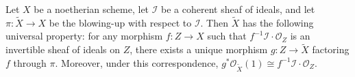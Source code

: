 Let $X$ be a noetherian scheme, let $\mathcal{I}$ be a coherent sheaf of ideals, and let $\pi: \tilde{X} \to X$ be the blowing-up with respect to $\mathcal{I}$. Then $\tilde{X}$ has the following universal property: for any morphism $f: Z \to X$ such that $f^{-1}\mathcal{I} \cdot \mathcal{O}_Z$ is an invertible sheaf of ideals on $Z$, there exists a unique morphism $g: Z \to \tilde{X}$ factoring $f$ through $\pi$. Moreover, under this correspondence, $g^*\mathcal{O}_{\tilde{X}}(1) \cong f^{-1}\mathcal{I} \cdot \mathcal{O}_Z$.
